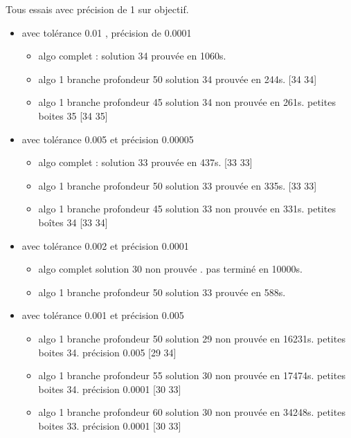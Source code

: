 \documentclass{article}
\begin{document}
Tous essais avec pr\'ecision de 1 sur objectif.
\begin{itemize}
\item avec tol\'erance 0.01 , pr\'ecision de 0.0001  

\begin{itemize}
\item algo complet :    solution 34 prouv\'ee en 1060s.

\item algo 1 branche profondeur 50  solution 34 prouv\'ee en 244s. [34 34]

\item algo 1 branche profondeur 45  solution 34 non prouv\'ee en 261s. petites boites 35  [34 35]



\end{itemize}

\item avec tol\'erance 0.005  et pr\'ecision 0.00005

\begin{itemize}
\item algo complet : solution 33 prouv\'ee en 437s.                   [33 33]

\item algo 1 branche profondeur 50 solution 33 prouv\'ee en 335s.      [33 33]

\item algo 1 branche profondeur 45 solution 33 non prouv\'ee en 331s.  petites boîtes 34  [33 34]

\end{itemize}



\item avec tol\'erance 0.002  et pr\'ecision 0.0001

\begin{itemize}
\item algo complet solution 30 non prouv\'ee . pas termin\'e en 10000s.
\item algo 1 branche profondeur 50 solution 33 prouv\'ee en 588s.
\end{itemize}


\item avec tol\'erance 0.001  et pr\'ecision 0.005
\begin{itemize}
\item  algo 1 branche profondeur 50 solution 29  non prouv\'ee en 16231s. petites boites 34. pr\'ecision 0.005 [29 34]
\item  algo 1 branche profondeur 55 solution 30  non prouv\'ee en 17474s. petites boites 34. pr\'ecision 0.0001  [30 33] 
\item  algo 1 branche profondeur 60 solution 30  non prouv\'ee en 34248s. petites boites 33. pr\'ecision 0.0001 [30 33]
\end{itemize}


\end{itemize}
\end{document}
